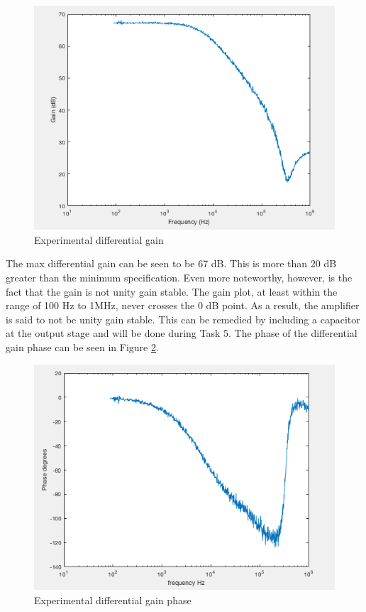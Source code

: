 \begin{figure}[H]
	\begin{center}
		\includegraphics[scale=.40]{ExperimentalImplementation/Ad_final.png}
		\caption{Experimental differential gain}
		\label{fig:finalAD}
	\end{center}
\end{figure}

The max differential gain can be seen to be 67 dB. This is more than 20 dB greater than the minimum specification. Even more noteworthy, however, is the fact that the gain is not unity gain stable. The gain plot, at least within the range of 100 Hz to 1MHz, never crosses the 0 dB point. As a result, the amplifier is said to not be unity gain stable. This can be remedied by including a capacitor at the output stage and will be done during Task 5. The phase of the differential gain phase can be seen in Figure \ref{fig:adphase}. 

\begin{figure}[H]
	\begin{center}
		\includegraphics[scale=.40]{ExperimentalImplementation/Ad_phase.png}
		\caption{Experimental differential gain phase}
		\label{fig:adphase}
	\end{center}
\end{figure}

